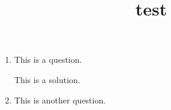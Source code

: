 \documentclass[12pt, letterpaper]{worksheet}
\title{test}
\begin{document}
\maketitle

\begin{enumerate}
  \item This is a question.
  \begin{solution}{3in}
    This is a solution.
  \end{solution}
  \item This is another question.
\end{enumerate}
\end{document}
